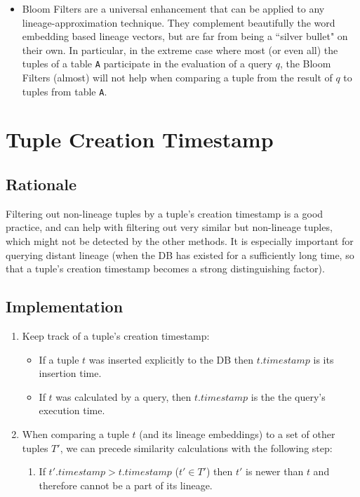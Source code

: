 \begin{itemize}
\begin{enumerate}
    \end{enumerate}
    \item Bloom Filters are a universal enhancement that can be applied to any lineage-approximation technique. They complement beautifully the word embedding based lineage vectors, but are far from being a ``silver bullet" on their own. In particular, in the extreme case where most (or even all) the tuples of a table \texttt{A} participate in the evaluation of a query $q$, the Bloom Filters (almost) will not help when comparing a tuple from the result of $q$ to tuples from table \texttt{A}.
\end{itemize}


\section{Tuple Creation Timestamp}
\subsection{Rationale} Filtering out non-lineage tuples by a tuple's creation timestamp is a good practice, and can help with filtering out very similar but non-lineage tuples, which might not be detected by the other methods. It is especially important for querying distant lineage (when the DB has existed for a sufficiently long time, so that a tuple's creation timestamp becomes a strong distinguishing factor).\\

\subsection{Implementation} 
\begin{enumerate}
    \item Keep track of a tuple's creation timestamp:
    \begin{itemize}
        \item If a tuple $t$ was inserted explicitly to the DB then $t.timestamp$ is its insertion time.
        \item If $t$ was calculated by a query, then $t.timestamp$ is the the query's execution time.
    \end{itemize}
    \item When comparing a tuple $t$ (and its lineage embeddings) to a set of other tuples $T'$, we can precede similarity calculations with the following step:
    \begin{enumerate}
        \item If $t'.timestamp > t.timestamp$ ($t' \in T'$) then $t'$ is newer than $t$ and therefore cannot be a part of its lineage.
    \end{enumerate}
\end{enumerate}


